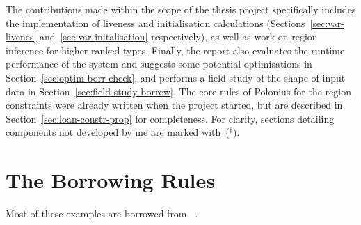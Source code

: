 \documentclass[11pt,a4paper,twoside,openany]{report}
\newcommand{\notmine}[0] {$^\dagger$}
\begin{document}
The contributions made within the scope of the thesis project specifically
includes the implementation of liveness and initialisation calculations
(Sections~\ref{sec:var-livenes} and~\ref{sec:var-initalisation} respectively),
as well as work on region inference for higher-ranked types. Finally, the report
also evaluates the runtime performance of the system and suggests some potential
optimisations in Section~\ref{sec:optim-borr-check}, and performs a field study
of the shape of input data in Section~\ref{sec:field-study-borrow}. The core
rules of Polonius for the region constraints were already written when the
project started, but are described in Section~\ref{sec:loan-constr-prop} for
completeness. For clarity, sections detailing components not developed by me are
marked with~(\notmine{}).

\section{The Borrowing Rules}\label{sec:borrowing-rules}
Most of these examples are borrowed from
\citeauthor{weiss_oxide:_2019}~\cite{weiss_oxide:_2019}.
\end{document}
